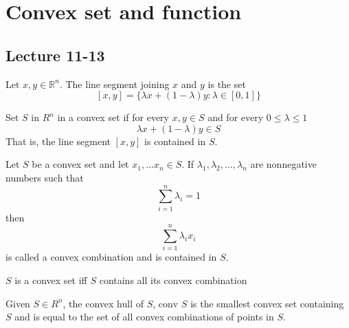 \section{Convex set and function}
\subsection{Lecture 11-13}
\begin{definition}
    Let $x,y \in \mathbb R^n$. The line segment joining $x$ and $y$ is the set
    $$[x,y] = \{\lambda x + (1 - \lambda)y : \lambda \in [0,1]\}$$
\end{definition}

\begin{definition}
    Set $S$ in $R^n$ in a convex set if for every $x, y \in S$ and for every  $0\leq \lambda \leq 1$ $$\lambda x+(1-\lambda)y\in S$$
    That is, the line segment $[x,y]$ is contained in $S$.
\end{definition}
\begin{definition}
    Let $S$ be a convex set and let $x_1,\ldots x_n \in S$. If $\lambda_1,\lambda_2,\ldots,\lambda_n$ are nonnegative numbers such that $$\sum_{i=1}^{n} \lambda_i = 1$$ then $$\sum^n_{i=1} \lambda_i x_i$$ is called a convex combination and is contained in $S$.
\end{definition}

\begin{lemma}
    $S$ is a convex set iff $S$ contains all its convex combination
\end{lemma}
\begin{definition}
    Given $S\in R^n$, the convex hull of $S$, $\text{conv }S$ is the smallest convex set containing $S$ and is equal to the set of all convex combinations of points in $S$.
\end{definition}

